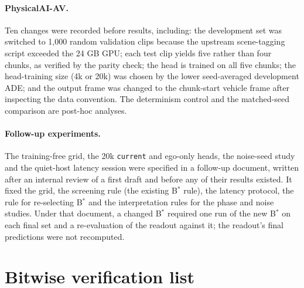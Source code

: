 \documentclass[10pt]{article}
\newcommand{\Bstar}{B$^{*}$}
\newcommand{\current}{\texttt{current}}
\begin{document}
\paragraph{PhysicalAI-AV.} Ten changes were recorded before results, including: the development set was switched to 1,000 random validation clips because the upstream scene-tagging script exceeded the 24 GB GPU; each test clip yields five rather than four chunks, as verified by the parity check; the head is trained on all five chunks; the head-training size (4k or 20k) was chosen by the lower seed-averaged development ADE; and the output frame was changed to the chunk-start vehicle frame after inspecting the data convention. The determinism control and the matched-seed comparison are post-hoc analyses.

\paragraph{Follow-up experiments.} The training-free grid, the 20k \current{} and ego-only heads, the noise-seed study and the quiet-host latency session were specified in a follow-up document, written after an internal review of a first draft and before any of their results existed. It fixed the grid, the screening rule (the existing \Bstar{} rule), the latency protocol, the rule for re-selecting \Bstar{} and the interpretation rules for the phase and noise studies. Under that document, a changed \Bstar{} required one run of the new \Bstar{} on each final set and a re-evaluation of the readout against it; the readout's final predictions were not recomputed.

\section{Bitwise verification list}
\label{app:verification}
\end{document}
